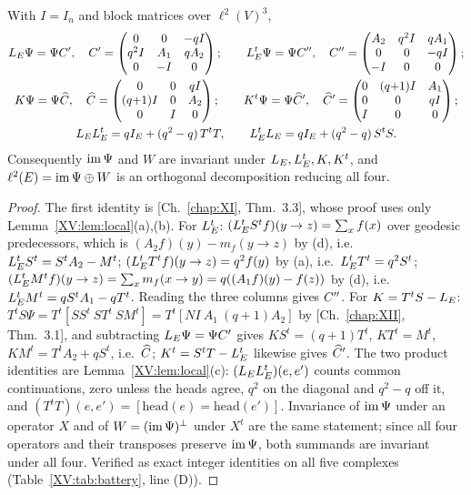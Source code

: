 \begin{theorem}\label{XV:thm:two}
With $I=I_n$ and block matrices over $\ell^{2}(V)^{3}$,
\begin{gather*}
L_E\Psi=\Psi C',\quad C'=\begin{pmatrix}0&0&-qI\\ q^{2}I&A_1&qA_2\\0&-I&0\end{pmatrix};\qquad
L_E^{t}\Psi=\Psi C'',\quad C''=\begin{pmatrix}A_2&q^{2}I&qA_1\\0&0&-qI\\-I&0&0\end{pmatrix};\\
K\Psi=\Psi\widehat C,\quad \widehat C=\begin{pmatrix}0&0&qI\\(q{+}1)I&0&A_2\\0&I&0\end{pmatrix};\qquad
K^{t}\Psi=\Psi\widehat C{}',\quad \widehat C{}'=\begin{pmatrix}0&(q{+}1)I&A_1\\0&0&qI\\I&0&0\end{pmatrix};\\
L_EL_E^{t}=qI_E+(q^{2}-q)\,T^{t}T,\qquad L_E^{t}L_E=qI_E+(q^{2}-q)\,S^{t}S .
\end{gather*}
Consequently $\operatorname{im}\Psi$ and $W$ are invariant under $L_E,L_E^{t},K,K^{t}$, and
$\ell^{2}(E)=\operatorname{im}\Psi\oplus W$ is an orthogonal decomposition reducing all four.
\end{theorem}

\begin{proof}
The first identity is [Ch.~\ref{chap:XI}, Thm.~3.3], whose proof uses only Lemma~\ref{XV:lem:local}(a),(b).
For $L_E^{t}$: $(L_E^{t}S^{t}f)(y\to z)=\sum_{x}f(x)$ over geodesic predecessors, which is
$(A_2f)(y)-m_f(y\to z)$ by (d), i.e.\ $L_E^{t}S^{t}=S^{t}A_2-M^{t}$; $(L_E^{t}T^{t}f)(y\to z)=q^{2}f(y)$
by (a), i.e.\ $L_E^{t}T^{t}=q^{2}S^{t}$; $(L_E^{t}M^{t}f)(y\to z)=\sum_xm_f(x\to y)=q((A_1f)(y)-f(z))$
by (d), i.e.\ $L_E^{t}M^{t}=qS^{t}A_1-qT^{t}$. Reading the three columns gives $C''$. For
$K=T^{t}S-L_E$: $T^{t}S\Psi=T^{t}[SS^{t}\ ST^{t}\ SM^{t}]=T^{t}[NI\ A_1\ (q{+}1)A_2]$ by
[Ch.~\ref{chap:XII}, Thm.~3.1], and subtracting $L_E\Psi=\Psi C'$ gives $KS^{t}=(q{+}1)T^{t}$, $KT^{t}=M^{t}$,
$KM^{t}=T^{t}A_2+qS^{t}$, i.e.\ $\widehat C$; $K^{t}=S^{t}T-L_E^{t}$ likewise gives $\widehat C{}'$. The two
product identities are Lemma~\ref{XV:lem:local}(c): $(L_EL_E^{t})(e,e')$ counts common
continuations, zero unless the heads agree, $q^{2}$ on the diagonal and $q^{2}-q$ off it, and
$(T^{t}T)(e,e')=[\text{head}(e)=\text{head}(e')]$. Invariance of $\operatorname{im}\Psi$ under an operator
$X$ and of $W=(\operatorname{im}\Psi)^{\perp}$ under $X^{t}$ are the same statement; since all four
operators and their transposes preserve $\operatorname{im}\Psi$, both summands are invariant under all
four. Verified as exact integer identities on all five complexes (Table~\ref{XV:tab:battery},
line (D)).
\end{proof}

